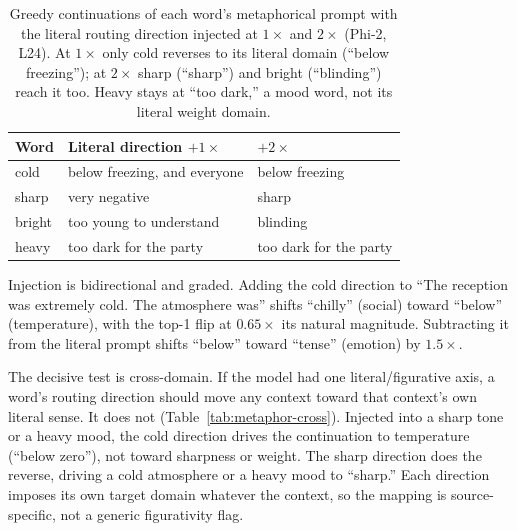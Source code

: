 \documentclass[11pt]{article}
\begin{document}
\begin{table}[htbp]
\centering
\small
\begin{tabularx}{\columnwidth}{@{}lYY@{}}
\toprule
Word & Literal direction $+1\times$ & $+2\times$ \\
\midrule
cold   & below freezing, and everyone & below freezing \\
sharp  & very negative                & sharp \\
bright & too young to understand      & blinding \\
heavy  & too dark for the party       & too dark for the party \\
\bottomrule
\end{tabularx}
\caption{Greedy continuations of each word's metaphorical prompt with the
literal routing direction injected at $1\times$ and $2\times$ (Phi-2, L24). At
$1\times$ only cold reverses to its literal domain (``below freezing''); at
$2\times$ sharp (``sharp'') and bright (``blinding'') reach it too. Heavy stays
at ``too dark,'' a mood word, not its literal weight domain.}
\label{tab:metaphor-gen}
\end{table}

Injection is bidirectional and graded. Adding the cold direction to ``The
reception was extremely cold. The atmosphere was'' shifts ``chilly'' (social)
toward ``below'' (temperature), with the top-1 flip at $0.65\times$ its natural
magnitude. Subtracting it from the literal prompt shifts ``below'' toward
``tense'' (emotion) by $1.5\times$.

The decisive test is cross-domain. If the model had one literal/figurative axis,
a word's routing direction should move any context toward that context's own
literal sense. It does not (Table~\ref{tab:metaphor-cross}). Injected into a
sharp tone or a heavy mood, the cold direction drives the continuation to
temperature (``below zero''), not toward sharpness or weight. The sharp direction
does the reverse, driving a cold atmosphere or a heavy mood to ``sharp.'' Each
direction imposes its own target domain whatever the context, so the mapping is
source-specific, not a generic figurativity flag.
\end{document}
